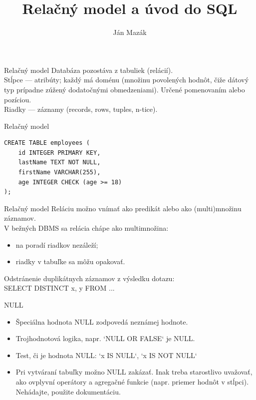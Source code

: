 \documentclass[12pt]{beamer}
\title{Relačný model a úvod do SQL}
\author{Ján Mazák}
\institute{FMFI UK Bratislava}
\date{}
\begin{document}
\frame{\titlepage}

\begin{frame}{Relačný model}
Databáza pozostáva z tabuliek (\alert{relácií}).\\[3mm]

Stĺpce --- \alert{atribúty}; každý má doménu (množinu povolených hodnôt, čiže dátový typ prípadne zúžený dodatočnými obmedzeniami). Určené pomenovaním alebo pozíciou.\\[3mm]

Riadky --- \alert{záznamy} (records, rows, tuples, n-tice).
\end{frame}

\begin{frame}[fragile]{Relačný model}
\begin{verbatim}
CREATE TABLE employees (
    id INTEGER PRIMARY KEY,
    lastName TEXT NOT NULL,
    firstName VARCHAR(255),
    age INTEGER CHECK (age >= 18)
);
\end{verbatim}
\end{frame}

\begin{frame}{Relačný model}
Reláciu možno vnímať ako predikát alebo ako (multi)množinu záznamov.\\[3mm]

V bežných DBMS sa relácia chápe ako multimnožina:
\begin{itemize}
\item na poradí riadkov nezáleží;
\item riadky v tabuľke sa môžu opakovať.
\end{itemize}

Odstránenie duplikátnych záznamov z výsledku dotazu:\\
SELECT DISTINCT x, y FROM ...
\end{frame}

\begin{frame}{NULL}
\begin{itemize}
\item Špeciálna hodnota \alert{NULL} zodpovedá neznámej hodnote.
\item Trojhodnotová logika, napr. `NULL OR FALSE` je NULL.
\item Test, či je hodnota NULL: `x IS NULL`, `x IS NOT NULL`
\item Pri vytváraní tabuľky možno NULL zakázať.
Inak treba starostlivo uvažovať, ako ovplyvní operátory a agregačné funkcie (napr. priemer hodnôt v stĺpci).
Nehádajte, použite dokumentáciu.
\end{itemize}
\end{frame}
\end{document}
